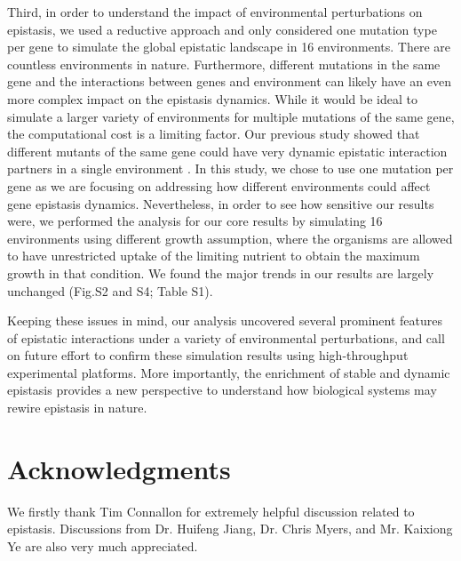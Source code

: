 \documentclass[10pt]{article}
\newcommand{\Figs}{Fig.} %
\newcommand{\citep}{\cite}
\begin{document}
Third, in order to understand the impact of environmental
perturbations on epistasis, we used a reductive approach and only
considered one mutation type per gene to simulate the global epistatic
landscape in 16 environments. There are countless environments in
nature. Furthermore, different mutations in the same gene and the
interactions between genes and environment can likely have an even
more complex impact on the epistasis dynamics. While it would be ideal
to simulate a larger variety of environments for multiple
mutations of the same gene, the computational cost is a limiting
factor. Our previous study showed that different mutants of the same
gene could have very dynamic epistatic interaction partners in a
single environment \citep{Xu2012}. In this study, we chose to use one
mutation per gene as we are focusing on addressing how different
environments could affect gene epistasis dynamics. Nevertheless, in
order to see how sensitive our results were, we performed the analysis
for our core results by simulating 16 environments using different
growth assumption, where the organisms are allowed to have
unrestricted uptake of the limiting nutrient to obtain the maximum
growth in that condition. We found the major trends in our results are
largely unchanged (\Figs\:S2 and S4; Table S1).

Keeping these issues in mind, our analysis uncovered several prominent
features of epistatic interactions under a variety of environmental
perturbations, and call on future effort to confirm these simulation
results using high-throughput experimental platforms. More
importantly, the enrichment of stable and dynamic epistasis provides a
new perspective to understand how biological systems may rewire
epistasis in nature.


\section*{Acknowledgments}

We firstly thank Tim Connallon for extremely helpful discussion
related to epistasis. Discussions from Dr. Huifeng Jiang, Dr. Chris
Myers, and Mr. Kaixiong Ye are also very much appreciated.

\end{document}
